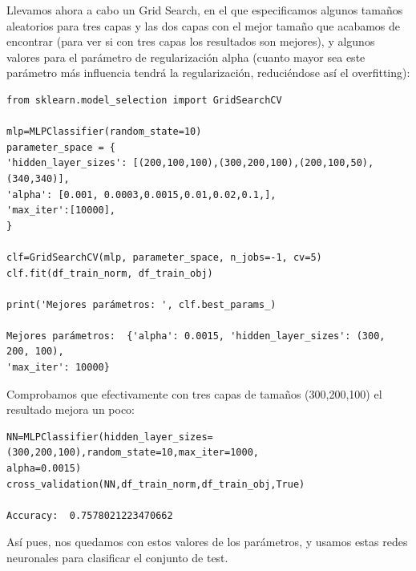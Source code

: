 \documentclass[a4paper,11pt]{article}
\begin{document}
Llevamos ahora a cabo un Grid Search, en el que especificamos algunos tamaños aleatorios para tres capas y las dos capas con el mejor tamaño que acabamos de encontrar (para ver si con tres capas los resultados son mejores), y algunos valores para el parámetro de regularización alpha (cuanto mayor sea este parámetro más influencia tendrá la regularización, reduciéndose así el overfitting):
\begin{verbatim}
from sklearn.model_selection import GridSearchCV

mlp=MLPClassifier(random_state=10)
parameter_space = {
'hidden_layer_sizes': [(200,100,100),(300,200,100),(200,100,50),(340,340)],
'alpha': [0.001, 0.0003,0.0015,0.01,0.02,0.1,],
'max_iter':[10000],
}

clf=GridSearchCV(mlp, parameter_space, n_jobs=-1, cv=5)
clf.fit(df_train_norm, df_train_obj)

print('Mejores parámetros: ', clf.best_params_)

Mejores parámetros:  {'alpha': 0.0015, 'hidden_layer_sizes': (300, 200, 100), 
'max_iter': 10000}
\end{verbatim}

Comprobamos que efectivamente con tres capas de tamaños (300,200,100) el resultado mejora un poco:
\begin{verbatim}
NN=MLPClassifier(hidden_layer_sizes=(300,200,100),random_state=10,max_iter=1000,
alpha=0.0015)
cross_validation(NN,df_train_norm,df_train_obj,True)

Accuracy:  0.7578021223470662
\end{verbatim}

Así pues, nos quedamos con estos valores de los parámetros, y usamos estas redes neuronales para clasificar el conjunto de test.\newpage 
\end{document}
